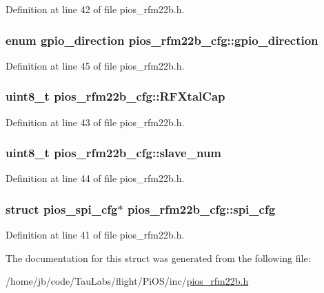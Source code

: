 \-Definition at line 42 of file pios\-\_\-rfm22b.\-h.

\hypertarget{structpios__rfm22b__cfg_ac8a55d600d26585b2fb4d58c4e197f9b}{
\subsubsection[{gpio\-\_\-direction}]{\setlength{\rightskip}{0pt plus 5cm}enum {\bf gpio\-\_\-direction} {\bf pios\-\_\-rfm22b\-\_\-cfg\-::gpio\-\_\-direction}}}\label{structpios__rfm22b__cfg_ac8a55d600d26585b2fb4d58c4e197f9b}


\-Definition at line 45 of file pios\-\_\-rfm22b.\-h.

\hypertarget{structpios__rfm22b__cfg_a20784354b27515bed19c3fa02b880a10}{
\subsubsection[{\-R\-F\-Xtal\-Cap}]{\setlength{\rightskip}{0pt plus 5cm}uint8\-\_\-t {\bf pios\-\_\-rfm22b\-\_\-cfg\-::\-R\-F\-Xtal\-Cap}}}\label{structpios__rfm22b__cfg_a20784354b27515bed19c3fa02b880a10}


\-Definition at line 43 of file pios\-\_\-rfm22b.\-h.

\hypertarget{structpios__rfm22b__cfg_a71f36f077e13645e984cb88f10e2fa0e}{
\subsubsection[{slave\-\_\-num}]{\setlength{\rightskip}{0pt plus 5cm}uint8\-\_\-t {\bf pios\-\_\-rfm22b\-\_\-cfg\-::slave\-\_\-num}}}\label{structpios__rfm22b__cfg_a71f36f077e13645e984cb88f10e2fa0e}


\-Definition at line 44 of file pios\-\_\-rfm22b.\-h.

\hypertarget{structpios__rfm22b__cfg_aa6c10909092b21bbdec314781785bf5d}{
\subsubsection[{spi\-\_\-cfg}]{\setlength{\rightskip}{0pt plus 5cm}struct {\bf pios\-\_\-spi\-\_\-cfg}$\ast$ {\bf pios\-\_\-rfm22b\-\_\-cfg\-::spi\-\_\-cfg}}}\label{structpios__rfm22b__cfg_aa6c10909092b21bbdec314781785bf5d}


\-Definition at line 41 of file pios\-\_\-rfm22b.\-h.



\-The documentation for this struct was generated from the following file\-:\begin{DoxyCompactItemize}
\item 
/home/jb/code/\-Tau\-Labs/flight/\-Pi\-O\-S/inc/\hyperlink{pios__rfm22b_8h}{pios\-\_\-rfm22b.\-h}\end{DoxyCompactItemize}
